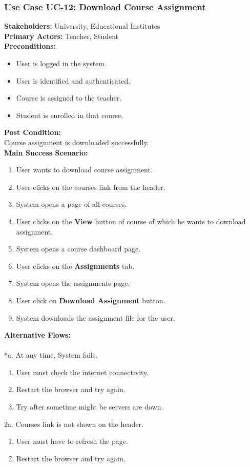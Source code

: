 \documentclass[12pt]{article}
\begin{document}
\subsubsection{Use Case UC-12: Download Course Assignment}
\textbf{Stakeholders: } University, Educational Institutes \\
\textbf{Primary Actors: }Teacher, Student \\
\textbf{Preconditions:}
\begin{itemize}
\item User is logged in the system.
\item User is identified and authenticated.
\item Course is assigned to the teacher.
\item Student is enrolled in that course.
\end{itemize}
\textbf{Post Condition: }\\
Course assignment is downloaded successfully.\\
\textbf{Main Success Scenario:}
\begin{enumerate}
\item User wants to download course assignment.
\item User clicks on the courses link from the header.
\item System opens a page of all courses.
\item User clicks on the \textbf{View} button of course of which he wants to download assignment.
\item System opens a course dashboard page.
\item User clicks on the \textbf{Assignments} tab.
\item System opens the assignments page.
\item User click on \textbf{Download Assignment} button.
\item System downloads the assignment file for the user.
\end{enumerate}
\textbf{Alternative Flows:}\\
\\
*a. At any time, System fails.
\begin{enumerate}
\item User must check the internet connectivity.
\item Restart the browser and try again.
\item Try after sometime might be servers are down.
\end{enumerate}
2a. Courses link is not shown on the header.
\begin{enumerate}
\item User must have to refresh the page.
\item Restart the browser and try again.
\end{enumerate} 
\end{document}
